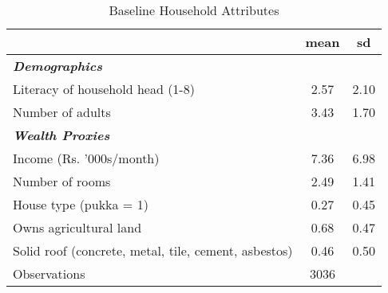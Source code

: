 \begin{table}[htbp]\centering
\def\sym#1{\ifmmode^{#1}\else\(^{#1}\)\fi}
\caption{Baseline Household Attributes\label {tab1}}
\begin{tabular}{l*{1}{cc}}
\toprule
                    &        mean&          sd\\
\midrule
\textbf{\emph{Demographics}}&            &            \\
Literacy of household head (1-8)&        2.57&        2.10\\
Number of adults    &        3.43&        1.70\\
\textbf{\emph{Wealth Proxies}}&            &            \\
Income (Rs. '000s/month)&        7.36&        6.98\\
Number of rooms     &        2.49&        1.41\\
House type (pukka = 1)&        0.27&        0.45\\
Owns agricultural land&        0.68&        0.47\\
Solid roof (concrete, metal, tile, cement, asbestos)&        0.46&        0.50\\
\midrule
Observations        &        3036&            \\
\bottomrule
\end{tabular}
\end{table}
